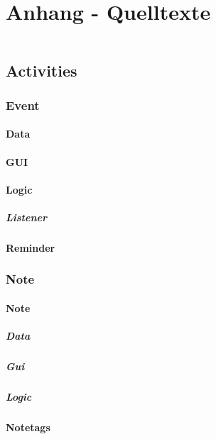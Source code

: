 \section{Anhang - Quelltexte}
\label{instal}

\begin{figure}[H]
\begin{lstlisting}[caption=Titel (Vorname Nachname)]

\end{lstlisting}
\end{figure}


\subsection{Activities}
	\subsubsection{Event}
		\paragraph{Data}
		\paragraph{GUI}
		\paragraph{Logic}
			\subparagraph{Listener}
		\paragraph{Reminder}
	\subsubsection{Note}
		\paragraph{Note}
			\subparagraph{Data}
			\subparagraph{Gui}
			\subparagraph{Logic}
		\paragraph{Notetags}
